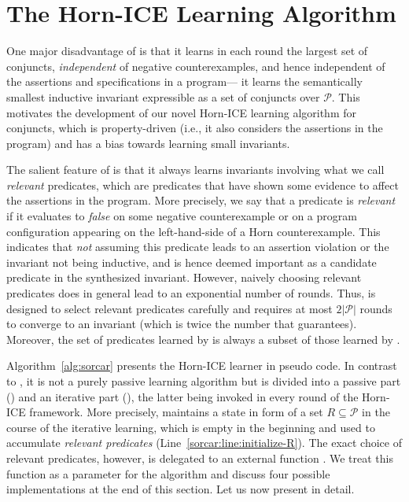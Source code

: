 
\section{The \sorcar Horn-ICE Learning Algorithm}
\label{sec:sorcar}

One major disadvantage of \houdini is that it learns in each round the largest set of conjuncts, \emph{independent} of negative counterexamples, and hence independent of the assertions and specifications in a program--- it learns the semantically smallest inductive invariant expressible as a set of conjuncts over $\mathcal P$.
This motivates the development of our novel \sorcar Horn-ICE learning algorithm for conjuncts, which is property-driven (i.e., it also considers the assertions in the program) and has a bias towards learning small invariants.

The salient feature of \sorcar is that it always learns invariants involving what we call \emph{relevant} predicates, which are predicates that have shown some evidence to affect the assertions in the program.
More precisely, we say that a predicate is \emph{relevant} if it evaluates to \textit{false} on some negative counterexample or on a program configuration appearing on the left-hand-side of a Horn counterexample.
This indicates that \emph{not} assuming this predicate leads to an assertion violation or the invariant not being inductive, and is hence deemed important as a candidate predicate in the synthesized invariant.
However, naively choosing relevant predicates does in general lead to an exponential number of rounds.
Thus, \sorcar is designed to select relevant predicates carefully and requires at most $2 |\mathcal P|$ rounds to converge to an invariant (which is twice the number that \houdini guarantees).
Moreover, the set of predicates learned by \sorcar is always a subset of those learned by \houdini.

Algorithm~\ref{alg:sorcar} presents the \sorcar Horn-ICE learner in pseudo code.
In contrast to \houdini, it is not a purely passive learning algorithm but is divided into a passive part (\SorcarPassive) and an iterative part (\SorcarIterative), the latter being invoked in every round of the Horn-ICE framework.
More precisely, \SorcarIterative maintains a state in form of a set $R \subseteq \mathcal P$ in the course of the iterative learning, which is empty in the beginning and used to accumulate \emph{relevant predicates} (Line~\ref{sorcar:line:initialize-R}).
The exact choice of relevant predicates, however, is delegated to an external function \RelevantPredicates.
We treat this function as a parameter for the \sorcar algorithm and discuss four possible implementations at the end of this section.
Let us now present \sorcar in detail.

